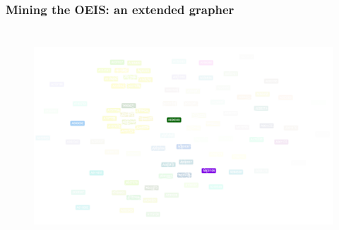 \documentclass[9pt]{beamer}
\begin{document}
\begin{frame}[fragile]
\frametitle{Mining the OEIS: an extended grapher}
\begin{figure}
\includegraphics[width=12cm,height=8cm]{coloured}

\end{figure}
\end{frame}
\end{document}
